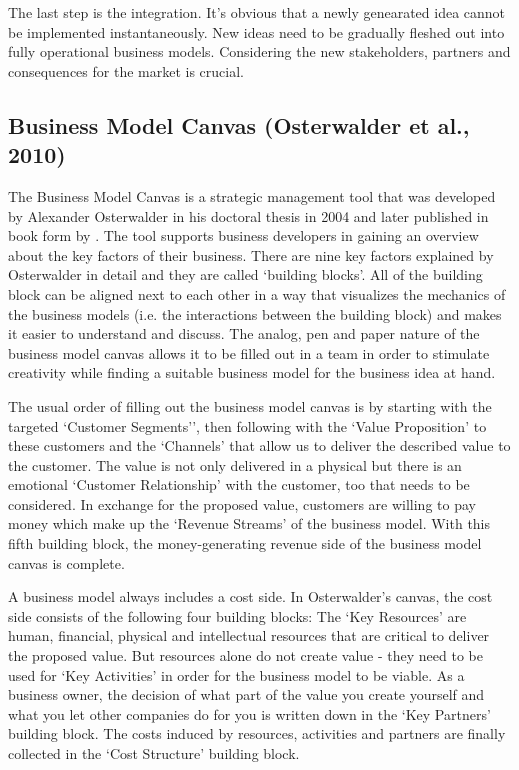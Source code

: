 	The last step is the integration. It's obvious that a newly genearated idea cannot be implemented instantaneously. New ideas need to be gradually fleshed out into fully operational business models. Considering the new stakeholders, partners and consequences for the market is crucial.

	\subsection{Business Model Canvas (Osterwalder et al., 2010)} 
		The Business Model Canvas is a strategic management tool that was developed by Alexander Osterwalder in his doctoral thesis in 2004 and later published in book form by \cite{osterwalder}. The tool supports business developers in gaining an overview about the key factors of their business. There are nine key factors explained by Osterwalder in detail and they are called `building blocks'. All of the building block can be aligned next to each other in a way that visualizes the mechanics of the business models (i.e. the interactions between the building block) and makes it easier to understand and discuss. The analog, pen and paper nature of the business model canvas allows it to be filled out in a team in order to stimulate creativity while finding a suitable business model for the business idea at hand.

		The usual order of filling out the business model canvas \cite{bmc} is by starting with the targeted `Customer Segments'', then following with the `Value Proposition' to these customers and the `Channels' that allow us to deliver the described value to the customer. The value is not only delivered in a physical but there is an emotional `Customer Relationship' with the customer, too that needs to be considered. In exchange for the proposed value, customers are willing to pay money which make up the `Revenue Streams' of the business model. With this fifth building block, the money-generating revenue side of the business model canvas is complete.

		A business model always includes a cost side. In Osterwalder's canvas, the cost side consists of the following four building blocks: The `Key Resources' are human, financial, physical and intellectual resources that are critical to deliver the proposed value. But resources alone do not create value - they need to be used for `Key Activities' in order for the business model to be viable. As a business owner, the decision of what part of the value you create yourself and what you let other companies do for you is written down in the `Key Partners' building block. The costs induced by resources, activities and partners are finally collected in the `Cost Structure' building block.


